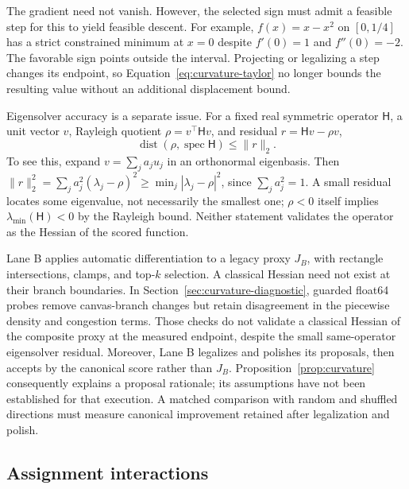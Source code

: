 The gradient need not vanish. However, the selected sign must admit a feasible
step for this to yield feasible descent. For example, $f(x)=x-x^2$ on
$[0,1/4]$ has a strict constrained minimum at $x=0$ despite $f'(0)=1$ and
$f''(0)=-2$. The favorable sign points outside the interval. Projecting or
legalizing a step changes its endpoint, so Equation~\eqref{eq:curvature-taylor}
no longer bounds the resulting value without an additional displacement bound.

Eigensolver accuracy is a separate issue. For a fixed real symmetric operator
$\mathsf H$, a unit vector $v$, Rayleigh quotient $\rho=v^\top\mathsf H v$,
and residual $r=\mathsf H v-\rho v$,
\begin{equation}
 \operatorname{dist}(\rho,\operatorname{spec}\mathsf H)\le\|r\|_2.
 \label{eq:eigen-residual}
\end{equation}
To see this, expand $v=\sum_j a_j u_j$ in an orthonormal eigenbasis. Then
$\|r\|_2^2=\sum_j a_j^2(\lambda_j-\rho)^2
\ge\min_j|\lambda_j-\rho|^2$, since $\sum_j a_j^2=1$.
A small residual locates some eigenvalue, not necessarily the smallest one;
$\rho<0$ itself implies $\lambda_{\min}(\mathsf H)<0$ by the Rayleigh bound.
Neither statement validates the operator as the Hessian of the scored function.

Lane B applies automatic differentiation to a legacy proxy $J_B$, with rectangle
intersections, clamps, and top-$k$ selection. A classical Hessian need not exist
at their branch boundaries. In Section~\ref{sec:curvature-diagnostic}, guarded
float64 probes remove canvas-branch changes but retain disagreement in the
piecewise density and congestion terms. Those checks do not validate a classical
Hessian of the composite proxy at the measured endpoint, despite the small
same-operator eigensolver residual.
Moreover, Lane B legalizes and polishes its proposals, then accepts by the
canonical score rather than $J_B$. Proposition~\ref{prop:curvature} consequently
explains a proposal rationale; its assumptions have not been established for
that execution. A matched comparison with random and shuffled directions must
measure canonical improvement retained after legalization and polish.

\subsection{Assignment interactions}\label{sec:assignment-analysis}

